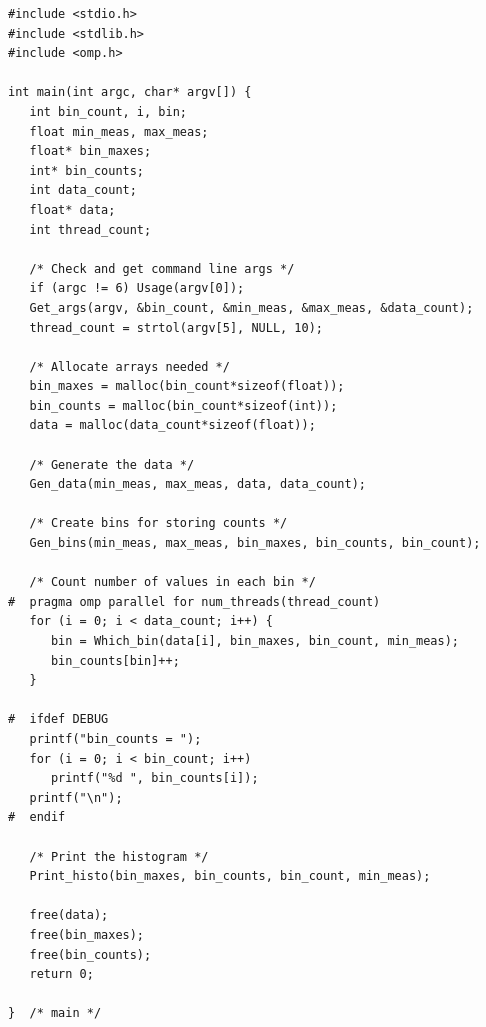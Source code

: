 \documentclass[a4paper,11pt,twoside]{article}
\begin{document}
\begin{verbatim}
#include <stdio.h>
#include <stdlib.h>
#include <omp.h>

int main(int argc, char* argv[]) {
   int bin_count, i, bin;
   float min_meas, max_meas;
   float* bin_maxes;
   int* bin_counts;
   int data_count;
   float* data;
   int thread_count;

   /* Check and get command line args */
   if (argc != 6) Usage(argv[0]); 
   Get_args(argv, &bin_count, &min_meas, &max_meas, &data_count);
   thread_count = strtol(argv[5], NULL, 10);

   /* Allocate arrays needed */
   bin_maxes = malloc(bin_count*sizeof(float));
   bin_counts = malloc(bin_count*sizeof(int));
   data = malloc(data_count*sizeof(float));

   /* Generate the data */
   Gen_data(min_meas, max_meas, data, data_count);

   /* Create bins for storing counts */
   Gen_bins(min_meas, max_meas, bin_maxes, bin_counts, bin_count);

   /* Count number of values in each bin */
#  pragma omp parallel for num_threads(thread_count)
   for (i = 0; i < data_count; i++) {
      bin = Which_bin(data[i], bin_maxes, bin_count, min_meas);
      bin_counts[bin]++;
   }

#  ifdef DEBUG
   printf("bin_counts = ");
   for (i = 0; i < bin_count; i++)
      printf("%d ", bin_counts[i]);
   printf("\n");
#  endif

   /* Print the histogram */
   Print_histo(bin_maxes, bin_counts, bin_count, min_meas);

   free(data);
   free(bin_maxes);
   free(bin_counts);
   return 0;

}  /* main */
\end{verbatim}
\end{document}
